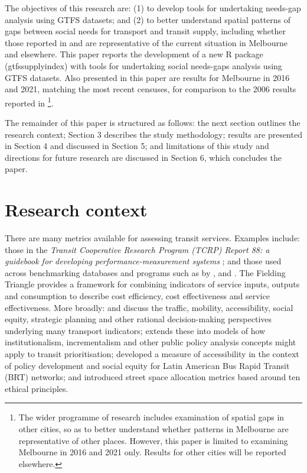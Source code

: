\documentclass[preprint, 3p,
authoryear]{elsarticle} %
\begin{document}
The objectives of this research are: (1) to develop tools for
undertaking needs-gap analysis using GTFS datasets; and (2) to better
understand spatial patterns of gaps between social needs for transport
and transit supply, including whether those reported in
\citet{Currie2007Identifying} and \citet{currie2010identifying} are
representative of the current situation in Melbourne and elsewhere. This
paper reports the development of a new R package (gtfssupplyindex) with
tools for undertaking social needs-gaps analysis using GTFS datasets.
Also presented in this paper are results for Melbourne in 2016 and 2021,
matching the most recent censuses, for comparison to the 2006 results
reported in \citet{currie2010identifying}\footnote{The wider programme
  of research includes examination of spatial gaps in other cities, so
  as to better understand whether patterns in Melbourne are
  representative of other places. However, this paper is limited to
  examining Melbourne in 2016 and 2021 only. Results for other cities
  will be reported elsewhere.}.

The remainder of this paper is structured as follows: the next section
outlines the research context; Section 3 describes the study
methodology; results are presented in Section 4 and discussed in Section
5; and limitations of this study and directions for future research are
discussed in Section 6, which concludes the paper.

\section{Research context}\label{research-context}

There are many metrics available for assessing transit services.
Examples include: those in the \emph{Transit Cooperative Research
Program (TCRP) Report 88: a guidebook for developing
performance-measurement systems} \citep{Ryus:2003aa}; and those used
across benchmarking databases and programs such as by
\citet{Florida-Transit-Information-System:2018aa}, \citet{UITP:2015aa}
and \citet{Imperial-College-London:2023aa}. The Fielding Triangle
\citep{FieldingGordonJ1987Mpts} provides a framework for combining
indicators of service inputs, outputs and consumption to describe cost
efficiency, cost effectiveness and service effectiveness. More broadly:
\citet{Litman:2003ab} and \citet{Litman:2016aa} discuss the traffic,
mobility, accessibility, social equity, strategic planning and other
rational decision-making perspectives underlying many transport
indicators; \citet{Reynolds:2017ah} extends these into models of how
institutionalism, incrementalism and other public policy analysis
concepts might apply to transit prioritisation;
\citet{GuzmanLuisA.2017Aeit} developed a measure of accessibility in the
context of policy development and social equity for Latin American Bus
Rapid Transit (BRT) networks; and
\citet{Creutzig2020streetspaceallocation} introduced street space
allocation metrics based around ten ethical principles.
\end{document}
